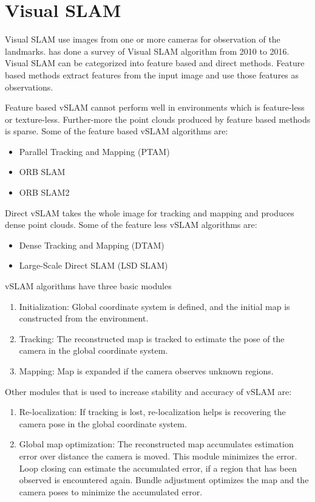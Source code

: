 \section{Visual SLAM}
Visual SLAM use images from one or more cameras for observation of the landmarks.  has done a survey of Visual SLAM algorithm from 2010 to 2016. Visual SLAM can be categorized into feature based and direct methods. Feature based methods extract features from the input image and use those features as observations.

Feature based vSLAM cannot perform well in environments which is feature-less or texture-less. Further-more the point clouds produced by feature based methods is sparse. Some of the feature based vSLAM algorithms are:

\begin{itemize}
	\item Parallel Tracking and Mapping (PTAM) \cite{4538852}
	\item ORB SLAM \cite{7219438}
	\item ORB SLAM2 \cite{7946260}
	
\end{itemize}


Direct vSLAM takes the whole image for tracking and mapping and produces dense point clouds. Some of the feature less vSLAM algorithms are:

\begin{itemize}
	\item Dense Tracking and Mapping (DTAM) \cite{6126513}
	\item Large-Scale Direct SLAM (LSD SLAM) \cite{Engel2014LSDSLAMLD}
\end{itemize}

vSLAM algorithms have three basic modules 
\begin{enumerate}
	\item Initialization: Global coordinate system is defined, and the initial map is constructed from the environment.
	\item Tracking: The reconstructed map is tracked to estimate the pose of the camera in the global coordinate system.
	\item Mapping: Map is expanded if the camera observes unknown regions.
\end{enumerate}

Other modules that is used to increase stability and accuracy of vSLAM are:
\begin{enumerate}
	\item Re-localization: If tracking is lost, re-localization helps is recovering the camera pose in the global coordinate system.
	\item Global map optimization: The reconstructed map accumulates estimation error over distance the camera is moved. This module minimizes the error. Loop closing can estimate the accumulated error, if a region that has been observed is encountered again. Bundle adjustment optimizes the map and the camera poses to minimize the accumulated error.
\end{enumerate}


